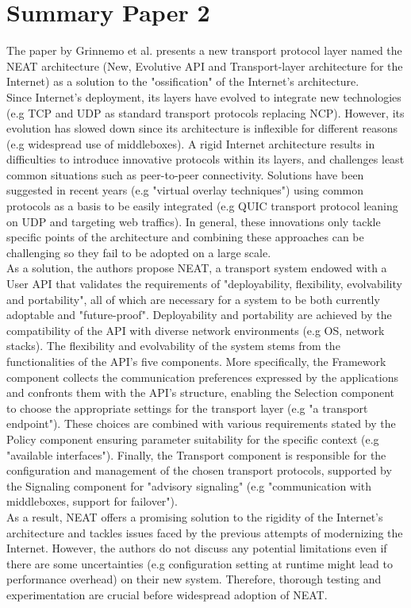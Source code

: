 \section{Summary Paper 2}%
\label{sec:Summary Paper 2}

The paper by Grinnemo et al. \cite{grinnemo2016towards} presents a new transport protocol layer named the NEAT architecture (New, Evolutive API and Transport-layer architecture for the Internet) as a solution to the "ossification" of the Internet's architecture. \\
Since Internet's deployment, its layers have evolved to integrate new technologies (e.g TCP and UDP as standard transport protocols replacing NCP). However, its evolution has slowed down since its architecture is inflexible for different reasons (e.g widespread use of middleboxes). A rigid Internet architecture results in difficulties to introduce innovative protocols within its layers, and challenges least common situations such as peer-to-peer connectivity. Solutions have been suggested in recent years (e.g "virtual overlay techniques") using common protocols as a basis to be easily integrated (e.g QUIC transport protocol leaning on UDP and targeting web traffics). In general, these innovations only tackle specific points of the architecture and combining these approaches can be challenging so they fail to be adopted on a large scale. \\
As a solution, the authors propose NEAT, a transport system endowed with a User API that validates the requirements of "deployability, flexibility, evolvability and portability", all of which are necessary for a system to be both currently adoptable and "future-proof". Deployability and portability are achieved by the compatibility of the API with diverse network environments (e.g OS, network stacks). The flexibility and evolvability of the system stems from the functionalities of the API's five components. More specifically, the Framework component collects the communication preferences expressed by the applications and confronts them with the API's structure, enabling the Selection component to choose the appropriate settings for the transport layer (e.g "a transport endpoint"). These choices are combined with various requirements stated by the Policy component ensuring parameter suitability for the specific context (e.g "available interfaces"). Finally, the Transport component is responsible for the configuration and management of the chosen transport protocols, supported by the Signaling component for "advisory signaling" (e.g "communication with middleboxes, support for failover").\\
As a result, NEAT offers a promising solution to the rigidity of the Internet's architecture and tackles issues faced by the previous attempts of modernizing the Internet. However, the authors do not discuss any potential limitations even if there are some uncertainties (e.g configuration setting at runtime might lead to performance overhead) on their new system. Therefore, thorough testing and experimentation are crucial before widespread adoption of NEAT. 
